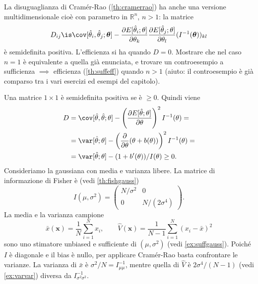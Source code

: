 \begin{exercise}
    La disuguaglianza di Cramér-Rao (\autoref{th:cramerrao}) ha anche una
    versione multidimensionale cioè con parametro in $\mathbb R^n$, $n > 1$:
    la matrice
    \begin{equation*}
        D_{ij} \is
        \cov[\hat\theta_i, \hat\theta_j;\boldsymbol\theta] -
        \frac{\partial E[\hat\theta_i;\theta]}{\partial\theta_k}
        \frac{\partial E[\hat\theta_j;\theta]}{\partial\theta_l}
        (I^{-1}(\boldsymbol\theta))_{kl}
    \end{equation*}
    è semidefinita positiva. L'efficienza si ha quando $D = 0$. Mostrare che
    nel caso $n = 1$ è equivalente a quella già enunciata, e trovare un
    controesempio a sufficienza $\implies$ efficienza (\autoref{th:suffeff})
    quando $n > 1$ (aiuto: il controesempio è già comparso tra i vari esercizi
    ed esempi del capitolo).
\end{exercise}

\begin{solution}
    Una matrice $1\times1$ è semidefinita positiva se è $\ge 0$. Quindi viene
    \begin{align*}
        D &= \cov[\hat\theta,\hat\theta;\theta] -
        \left(\frac{\partial E[\hat\theta;\theta]}{\partial\theta}\right)^2
        I^{-1}(\theta) = \\
        &= \var[\hat\theta;\theta] -
        \left(\frac{\partial}{\partial\theta}(\theta + b(\theta))\right)^2
        I^{-1}(\theta) = \\
        &= \var[\hat\theta;\theta] - (1 + b'(\theta))/I(\theta) \ge 0.
    \end{align*}
    Consideriamo la gaussiana con media e varianza libere. La matrice di
    informazione di Fisher è (vedi \autoref{th:fishgauss})
    \begin{equation*}
        I(\mu,\sigma^2) = \begin{pmatrix}
            N/\sigma^2 & 0 \\
            0 & N/(2\sigma^4)
        \end{pmatrix}.
    \end{equation*}
    La media e la varianza campione
    \begin{equation*}
        \bar x(\mathbf x) = \frac 1N \sum_{i=1}^N x_i, \qquad
        \hat V(\mathbf x) = \frac 1{N-1} \sum_{i=1}^N (x_i - \bar x)^2
    \end{equation*}
    sono uno stimatore unbiased e sufficiente di $(\mu,\sigma^2)$ (vedi
    \autoref{ex:suffgauss}). Poiché $I$ è diagonale e il bias è nullo, per
    applicare Cramér-Rao basta confrontare le varianze. La varianza di $\bar x$
    è $\sigma^2/N = I_{\mu\mu}^{-1}$, mentre quella di $\hat V$ è
    $2\sigma^4/(N-1)$ (vedi \autoref{ex:varvar}) diversa da
    $I_{\sigma^2\sigma^2}^{-1}$.
\end{solution}

